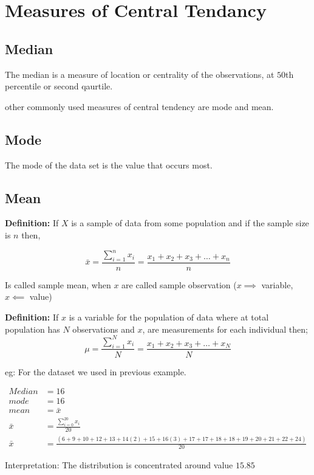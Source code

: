 \chapter{Measures of Central Tendancy}%

\section{Median}
The median is a measure of location or centrality of the observations, at $50$th percentile or second qaurtile.

other commonly used measures of central tendency are mode and mean.
\section{Mode}
The mode of the data set is the value that occurs most.
\section{Mean}

\textbf{Definition: }If $X$ is a sample of data from some population and if the sample size is $n$ then,


\begin{equation}
    \bar{x} = \frac{\sum_{i = 1}^{n} x_i}{n}= \frac{x_1 + x_2 + x_3 + \ldots + x_n}{n}
\end{equation}

Is called sample mean, when $x$ are called sample observation ($x \implies$ variable, $x \impliedby$ value)

\textbf{Definition: }If $x$ is a variable for the population of data where at total population has $N$ observations and $x$, are measurements for each individual then;
\begin{equation}
    \mu = \frac{\sum_{i = 1}^{N} x_i}{N}= \frac{x_1 + x_2 + x_3 + \ldots + x_N}{N}
\end{equation}

eg: For the dataset we used in previous example.

\begin{align*}
    Median  & = 16                                                                                                \\
    mode    & = 16                                                                                                \\
    mean    & = \bar{x}                                                                                           \\
    \bar{x} & = \frac{\sum_{i = 0}^{20}x_i }{20}                                                                  \\
    \bar{x} & = \frac{(6 + 9 + 10 + 12 +13 + 14(2) +15 + 16(3) + 17 + 17 + 18 + 18 + 19 + 20 + 21 + 22 + 24)}{20}
\end{align*}


Interpretation: The distribution is concentrated around value $15.85$

\newpage
